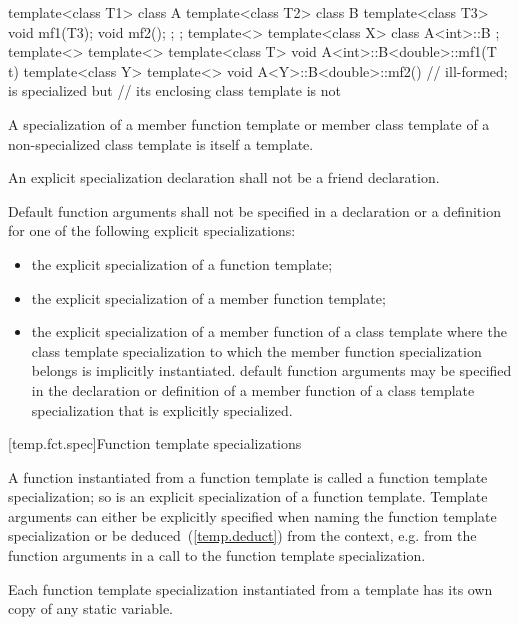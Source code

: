 \begin{codeblock}
template<class T1> class A {
	template<class T2> class B {
		template<class T3> void mf1(T3);
		void mf2();
	};
};
template<> template<class X>
  class A<int>::B { };
template<> template<> template<class T>
  void A<int>::B<double>::mf1(T t) { }
template<class Y> template<>
  void A<Y>::B<double>::mf2() { }   // ill-formed;  is specialized but
                                    // its enclosing class template  is not
\end{codeblock}
\exitexampleb

\pnum
A specialization of a member function template or member class template of
a non-specialized class template is itself a template.

\pnum
An explicit specialization declaration shall not be a friend declaration.

\pnum
Default function arguments shall not be specified in a declaration or
a definition for one of the following explicit specializations:

\begin{itemize}
\item
the explicit specialization of a function template;
\item
the explicit specialization of a member function template;
\item
the explicit specialization of a member function of a class template where
the class template specialization to which the member function specialization
belongs is implicitly instantiated.
\enternote
default function arguments may be specified in the declaration or
definition of a member function of a class template specialization that is
explicitly specialized.
\exitnote
\end{itemize}

[temp.fct.spec]{Function template specializations}

\pnum
{}%
A function instantiated from a function template is called a function template
specialization; so is an explicit specialization of a function template.
Template arguments can either be explicitly specified when naming the function
template specialization or be deduced~(\ref{temp.deduct}) from the context,
e.g. from the function arguments in a call to the function template
specialization.

\pnum
Each function template specialization instantiated from a template
has its own copy of any static variable.
\enterexample

